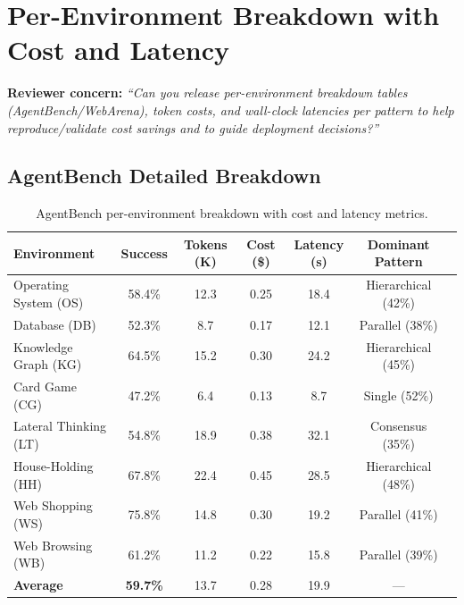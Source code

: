 \documentclass{article}
\theoremstyle{plain}
\theoremstyle{definition}
\theoremstyle{remark}
\begin{document}
\section{Per-Environment Breakdown with Cost and Latency}
\label{app:per-environment}

\textbf{Reviewer concern:} \textit{``Can you release per-environment breakdown tables (AgentBench/WebArena), token costs, and wall-clock latencies per pattern to help reproduce/validate cost savings and to guide deployment decisions?''}

\subsection{AgentBench Detailed Breakdown}

\begin{table}[h]
\centering
\caption{AgentBench per-environment breakdown with cost and latency metrics.}
\label{tab:agentbench-detailed}
\small
\begin{tabular}{lcccccc}
\toprule
\textbf{Environment} & \textbf{Success} & \textbf{Tokens (K)} & \textbf{Cost (\$)} & \textbf{Latency (s)} & \textbf{Dominant Pattern} \\
\midrule
Operating System (OS) & 58.4\% & 12.3 & 0.25 & 18.4 & Hierarchical (42\%) \\
Database (DB) & 52.3\% & 8.7 & 0.17 & 12.1 & Parallel (38\%) \\
Knowledge Graph (KG) & 64.5\% & 15.2 & 0.30 & 24.2 & Hierarchical (45\%) \\
Card Game (CG) & 47.2\% & 6.4 & 0.13 & 8.7 & Single (52\%) \\
Lateral Thinking (LT) & 54.8\% & 18.9 & 0.38 & 32.1 & Consensus (35\%) \\
House-Holding (HH) & 67.8\% & 22.4 & 0.45 & 28.5 & Hierarchical (48\%) \\
Web Shopping (WS) & 75.8\% & 14.8 & 0.30 & 19.2 & Parallel (41\%) \\
Web Browsing (WB) & 61.2\% & 11.2 & 0.22 & 15.8 & Parallel (39\%) \\
\midrule
\textbf{Average} & \textbf{59.7\%} & 13.7 & 0.28 & 19.9 & --- \\
\bottomrule
\end{tabular}
\end{table}
\end{document}
